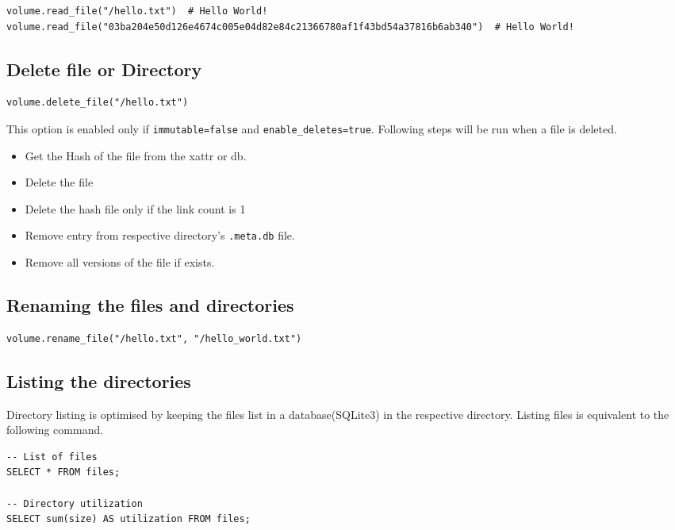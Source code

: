 \documentclass[10pt,a4paper]{article}
\begin{document}
\begin{multicols*}{2}
\begin{verbatim}
volume.read_file("/hello.txt")  # Hello World!
volume.read_file("03ba204e50d126e4674c005e04d82e84c21366780af1f43bd54a37816b6ab340")  # Hello World!
\end{verbatim}

\subsection{Delete file or Directory}
\begin{verbatim}
volume.delete_file("/hello.txt")
\end{verbatim}

This option is enabled only if \texttt{immutable=false} and \texttt{enable\_deletes=true}. Following steps will be run when a file is deleted.

\begin{itemize}
\item Get the Hash of the file from the xattr or db.
\item Delete the file
\item Delete the hash file only if the link count is 1
\item Remove entry from respective directory's \texttt{.meta.db} file.
\item Remove all versions of the file if exists.
\end{itemize}

\subsection{Renaming the files and directories}

\begin{verbatim}
volume.rename_file("/hello.txt", "/hello_world.txt")
\end{verbatim}

\subsection{Listing the directories}

Directory listing is optimised by keeping the files list in a database(SQLite3) in the respective directory. Listing files is equivalent to the following command.

\begin{verbatim}
-- List of files
SELECT * FROM files;

-- Directory utilization
SELECT sum(size) AS utilization FROM files;
\end{verbatim}


\end{multicols*}
\end{document}
